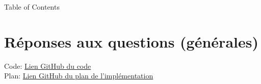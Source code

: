 \documentclass[french]{beamer}
\begin{document}
\frame{\titlepage}
\begin{frame}{Table of Contents}

\tableofcontents
\end{frame}


%
%








%
%
\section{Réponses aux questions (générales)}
\begin{frame}{\secname}

Code: {\small \href{https://github.com/David-Kyrat/12X009-OS-TPs/tree/master/TP03}{Lien GitHub du code} }\\

Plan: {\small 
     \href{https://github.com/David-Kyrat/12X009-OS-TPs/blob/master/TP05/instructions-report/TODO.md}{Lien GitHub du plan de l'implémentation}
}

\end{frame}
\end{document}
